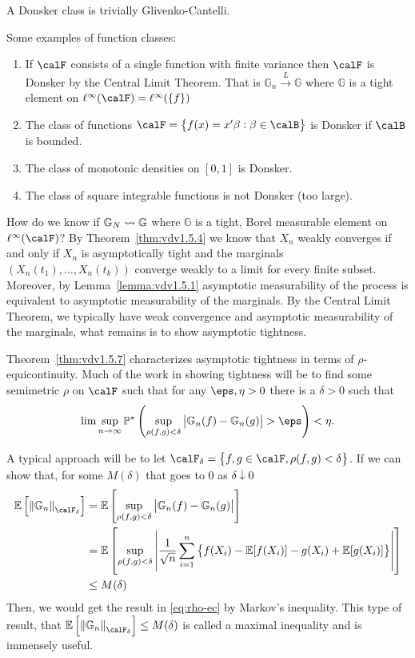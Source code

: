 A Donsker class is trivially Glivenko-Cantelli. 

\begin{example}
	Some examples of function classes:
	\begin{enumerate}
		\item If \(\calF\) consists of a single function with finite variance then \(\calF\) is Donsker by the Central Limit Theorem. That is  \(\mathbb{G}_n \overset{L}{\to}\mathbb{G}\) where \(\mathbb{G}\) is a tight element on \(\ell^\infty(\calF) = \ell^\infty(\{f\} )\) 
		\item The class of functions \(\calF = \left\{f(x) = x'\beta: \beta \in \calB\right\} \) is Donsker if \(\calB\) is bounded. 
		\item The class of monotonic densities on \([0,1]\) is Donsker. 
		\item The class of square integrable functions is not Donsker (too large).
	\end{enumerate}	
\end{example}

How do we know if \(\mathbb{G}_N \rightsquigarrow \mathbb{G}\) where \(\mathbb{G}\) is a tight, Borel measurable element on \(\ell^\infty(\calF)\)? By Theorem~\ref{thm:vdv1.5.4} we know that \(X_n\) weakly converges if and only if \(X_n\) is asymptotically tight and the marginals  \(\left(X_n(t_1),\dots,X_n(t_k)\right)\) converge weakly to a limit for every finite subset. Moreover, by Lemma~\ref{lemma:vdv1.5.1} asymptotic measurability of the process is equivalent to asymptotic measurability of the marginals. By the Central Limit Theorem, we typically have weak convergence and asymptotic measurability of the marginals, what remains is to show asymptotic tightness. 

Theorem~\ref{thm:vdv1.5.7} characterizes asymptotic tightness in terms of \(\rho\)-equicontinuity. Much of the work in showing tightness will be to find some semimetric \(\rho\) on \(\calF\) such that for any \(\eps, \eta > 0\) there is a  \(\delta > 0\) such that 
\begin{equation}
	\label{eq:rho-ec}
	\lim\sup_{n\to\infty}\P^\star\left(\sup_{\rho(f,g)<\delta}\left|\mathbb{G}_n(f)-\mathbb{G}_n(g)\right| > \eps\right) <\eta.
\end{equation}

A typical approach will be to let \(\calF_{{}\delta} = \left\{f,g \in \calF, \rho(f,g)<\delta\right\}\). If we can show that, for some \(M(\delta)\) that goes to 0 as \(\delta\downarrow 0\)
\begin{align*}
	\E\left[\left\|\mathbb{G}_n\right\|_{\calF_{{}\delta}}\right] 
	&= \E\left[\sup_{\rho(f,g)<\delta}\left|\mathbb{G}_n(f)-\mathbb{G}_n(g)\right|\right] \\
	&= \E\left[\sup_{\rho(f,g)<\delta}\left|\frac{1}{\sqrt{n}} \sum_{i=1}^n\left\{ f(X_i) - \E[f(X_i)] - g(X_i) + \E[g(X_i)]\right\}\right|\right] \\
	&\leq M(\delta)
\end{align*}
Then, we would get the result in \eqref{eq:rho-ec} by Markov's inequality. This type of result, that \(\E\left[\left\|\mathbb{G}_n\right\|_{\calF_{{}\delta}}\right] \leq M(\delta)\) is called a maximal inequality and is immensely useful.

